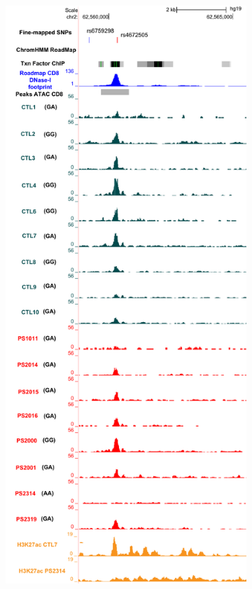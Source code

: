 \begin{figure}[htbp]
\begin{subfigure}[b]{0.45\textwidth}
\includegraphics[width=\textwidth]{./Results2/pdfs/chr2p15_rs4672505_FM_CD8_track_all_marks}

\end{subfigure}
\end{figure}
